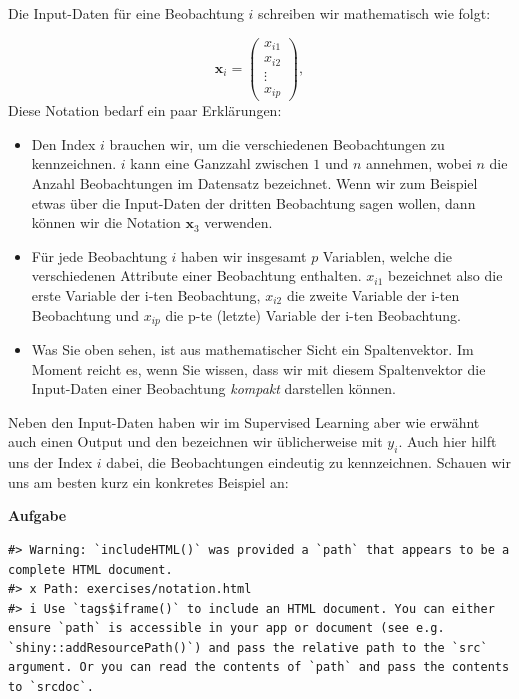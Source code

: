 \documentclass[
]{book}
\providecommand{\tightlist}{%
  \setlength{\itemsep}{0pt}\setlength{\parskip}{0pt}}
\begin{document}
Die Input-Daten für eine Beobachtung \(i\) schreiben wir mathematisch wie folgt:

\[
\mathbf{x}_i=\begin{pmatrix} x_{i1} \\ x_{i2} \\ \vdots \\ x_{ip} \end{pmatrix},
\]
Diese Notation bedarf ein paar Erklärungen:

\begin{itemize}
\tightlist
\item
  Den Index \(i\) brauchen wir, um die verschiedenen Beobachtungen zu kennzeichnen. \(i\) kann eine Ganzzahl zwischen \(1\) und \(n\) annehmen, wobei \(n\) die Anzahl Beobachtungen im Datensatz bezeichnet. Wenn wir zum Beispiel etwas über die Input-Daten der dritten Beobachtung sagen wollen, dann können wir die Notation \(\mathbf{x}_3\) verwenden.
\item
  Für jede Beobachtung \(i\) haben wir insgesamt \(p\) Variablen, welche die verschiedenen Attribute einer Beobachtung enthalten. \(x_{i1}\) bezeichnet also die erste Variable der i-ten Beobachtung, \(x_{i2}\) die zweite Variable der i-ten Beobachtung und \(x_{ip}\) die p-te (letzte) Variable der i-ten Beobachtung.
\item
  Was Sie oben sehen, ist aus mathematischer Sicht ein Spaltenvektor. Im Moment reicht es, wenn Sie wissen, dass wir mit diesem Spaltenvektor die Input-Daten einer Beobachtung \emph{kompakt} darstellen können.
\end{itemize}

Neben den Input-Daten haben wir im Supervised Learning aber wie erwähnt auch einen Output und den bezeichnen wir üblicherweise mit \(y_i\). Auch hier hilft uns der Index \(i\) dabei, die Beobachtungen eindeutig zu kennzeichnen. Schauen wir uns am besten kurz ein konkretes Beispiel an:

\textbf{Aufgabe}

\begin{verbatim}
#> Warning: `includeHTML()` was provided a `path` that appears to be a complete HTML document.
#> x Path: exercises/notation.html
#> i Use `tags$iframe()` to include an HTML document. You can either ensure `path` is accessible in your app or document (see e.g. `shiny::addResourcePath()`) and pass the relative path to the `src` argument. Or you can read the contents of `path` and pass the contents to `srcdoc`.
\end{verbatim}
\end{document}
